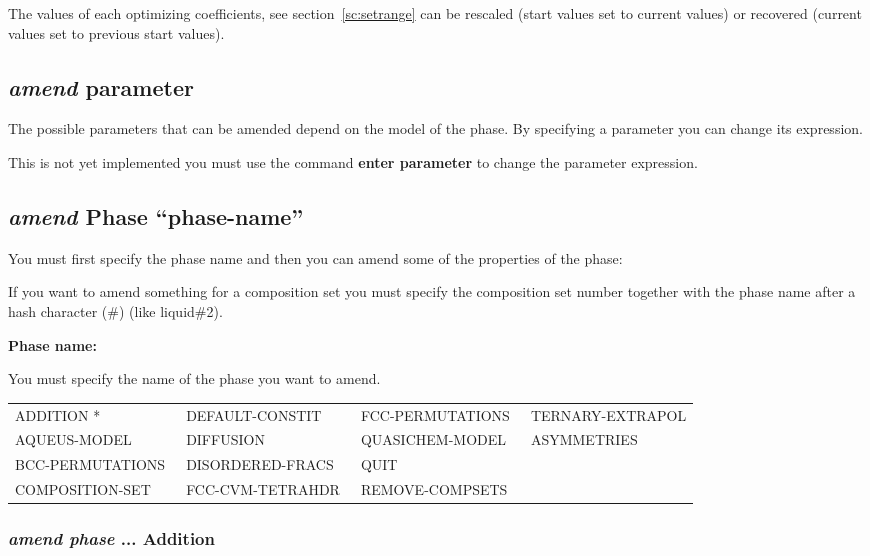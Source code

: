 \documentclass[11pt]{article}
\begin{document}
The values of each optimizing coefficients, see
section~\ref{sc:setrange} can be rescaled (start values set to current
values) or recovered (current values set to previous start values).

\hypertarget{Amend parameter}{}  
\subsection{{\em amend} parameter}

The possible parameters that can be amended depend on the model of the
phase.  By specifying a parameter you can change its expression.

This is not yet implemented you must use the command {\bf enter
  parameter} to change the parameter expression.

\hypertarget{Amend for phase}{}
\hypertarget{Amend phase}{}
\subsection{{\em amend} Phase ``phase-name''}\label{sc:amendph}

You must first specify the phase name and then you can amend some of
the properties of the phase:

If you want to amend something for a composition set you must specify
the composition set number together with the phase name after a hash
character (\#) (like liquid\#2).

{\bf Phase name:}

You must specify the name of the phase you want to amend.

{\small
\begin{tabular}{llll}
ADDITION *         & DEFAULT-CONSTIT  & FCC-PERMUTATIONS~ & TERNARY-EXTRAPOL\\ 
AQUEUS-MODEL       & DIFFUSION        & QUASICHEM-MODEL~  & ASYMMETRIES\\
BCC-PERMUTATIONS~  & DISORDERED-FRACS & QUIT              \\ 
COMPOSITION-SET    & FCC-CVM-TETRAHDR~ & REMOVE-COMPSETS  \\
\end{tabular}
}

\hypertarget{Amend addition}{}
\subsubsection{{\em amend phase} ... Addition }
\end{document}
